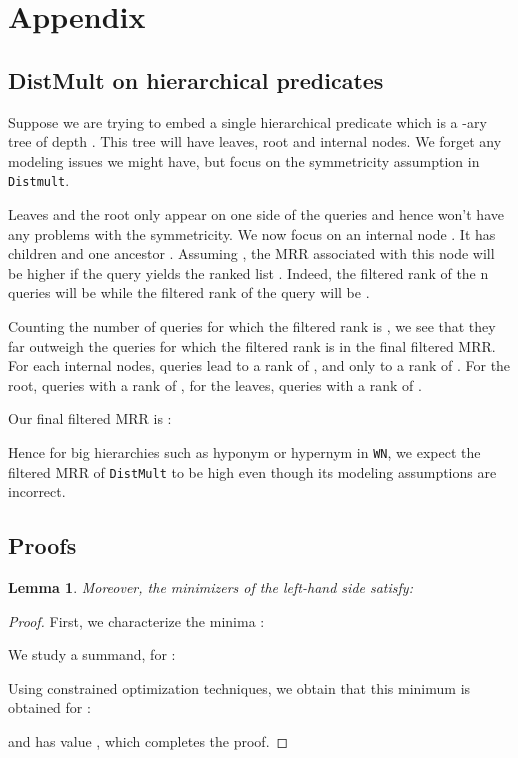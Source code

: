 \documentclass{article}
\newtheorem{lemma}{Lemma}
\begin{document}



\clearpage

\section{Appendix}
\subsection{DistMult on hierarchical predicates}
Suppose we are trying to embed a single hierarchical predicate  which is a -ary tree of depth . This tree will have  leaves,  root and  internal nodes. We forget any modeling issues we might have, but focus on the symmetricity assumption in {\tt Distmult}.

Leaves and the root only appear on one side of the queries  and hence won't have any problems with the symmetricity. We now focus on an internal node . It has  children  and one ancestor . Assuming , the MRR associated with this node will be higher if the query  yields the ranked list . Indeed, the filtered rank of the n queries  will be  while the filtered rank of the query  will be .

Counting the number of queries for which the filtered rank is , we see that they far outweigh the queries for which the filtered rank is  in the final filtered MRR. For each internal nodes,  queries lead to a rank of , and only  to a rank of . For the root,  queries with a rank of , for the leaves,  queries with a rank of .

Our final filtered MRR is :


Hence for big hierarchies such as hyponym or hypernym in {\tt WN}, we expect the filtered MRR of {\tt DistMult} to be high even though its modeling assumptions are incorrect.

\subsection{Proofs}
\label{app:proof}
\begin{lemma}

Moreover, the minimizers of the left-hand side satisfy: 

\end{lemma}
\begin{proof}
First, we characterize the minima :

We study a summand, for  :

Using constrained optimization techniques, we obtain that this minimum is obtained for :

and has value , which completes the proof.
\end{proof}
\end{document}
